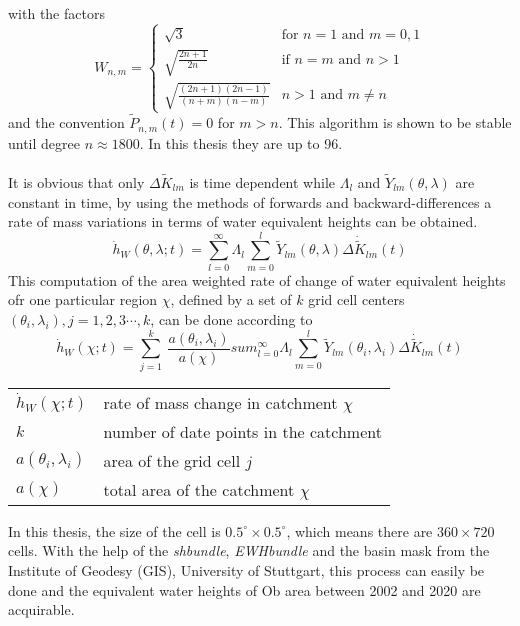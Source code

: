 with the factors
\begin{equation}
	W_{n,m} = \begin{cases}
	\sqrt{3} & \text{for $n = 1$ and $m = {0,1}$}\\
	\sqrt{\frac{2n+1}{2n}} & \text{if $n=m$ and $n>1$} \\
	\sqrt{\frac{(2n+1)(2n-1)}{(n+m)(n-m)}} & \text{$n>1$ and $m \neq n$}
	\end{cases}
\end{equation}                   
and the convention $\tilde{P}_{n,m}(t) = 0$ for  $m>n$. This algorithm is shown to be stable until degree $n \approx 1800$. In this thesis they are up to 96. \\\\
It is obvious that only $\Delta \tilde{K}_{lm}$ is time dependent while $\Lambda_{l}$ and $\tilde{Y}_{lm}(\theta,\lambda)$ are constant in time, by using the methods of forwards and backward-differences a rate of mass variations in terms of water equivalent heights can be obtained.
\begin{equation}
	\dot{h}_{W}(\theta,\lambda;t) = \sum_{l=0}^{\infty} \Lambda_{l} \sum_{m=0}^{l} \tilde{Y}_{lm}(\theta,\lambda) \Delta \dot{\tilde{K}}_{lm}(t)
\end{equation}
This computation of the area weighted rate of change of water equivalent heights ofr one particular region $\chi$, defined by a set of $k$ grid cell centers $(\theta_{i}, \lambda_{i}),j=1,2,3\cdots,k$, can be done according to
\begin{equation}
	\dot{h}_{W}(\chi;t) = \sum_{j=1}^{k}\ \frac{a(\theta_{i},\lambda_{i})}{a(\chi)} sum_{l=0}^{\infty} \Lambda_{l} \sum_{m=0}^{l} \tilde{Y}_{lm}(\theta_{i},\lambda_{i}) \Delta \dot{\tilde{K}}_{lm}(t)
\end{equation}
\begin{table}[htbp]
	\begin{tabular}{ll}
	$\dot{h}_{W}(\chi;t)$	&  rate of mass change in catchment $\chi$\\ 
	$k$	&  number of date points in the catchment\\ 
	$a(\theta_{i},\lambda_{i})$	&  area of the grid cell $j$\\ 
	$a(\chi)$	&  total area of the catchment $\chi$\\ 
	\end{tabular}
\end{table}
In this thesis, the size of the cell is $0.5^{\circ} \times 0.5^{\circ}$, which means there are $360 \times 720$ cells.
With the help of the \textit{shbundle}, \textit{EWHbundle} and the basin mask from the Institute of Geodesy (GIS), University of Stuttgart, this process can easily be done and the equivalent water heights of Ob area between 2002 and 2020 are acquirable. 
